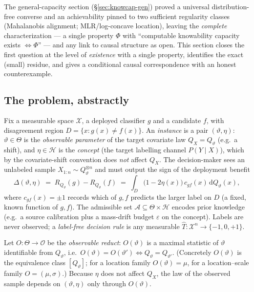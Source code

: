 \providecommand{\TV}{\mathrm{TV}}
\providecommand{\sgn}{\operatorname{sign}}

The general-capacity section (\S\ref{sec:knowcap-gen}) proved a universal
distribution-free converse and an achievability pinned to two sufficient
regularity classes (Mahalanobis alignment; MLR/log-concave location), leaving the
\emph{complete} characterization --- a single property $\Phi$ with
``computable knowability capacity exists $\iff\Phi$'' --- and any link to causal
structure as open. This section closes the first question at the level of
\emph{existence} with a single property, identifies the exact (small) residue, and
gives a conditional causal correspondence with an honest counterexample.

\subsection{The problem, abstractly}\label{sec:dich-abstract}
Fix a measurable space $\mathcal X$, a deployed classifier $g$ and a candidate $f$,
with disagreement region $D=\{x:g(x)\neq f(x)\}$. An \emph{instance} is a pair
$(\vartheta,\eta)$: $\vartheta\in\Theta$ is the \emph{observable parameter} of the
target covariate law $Q_X=Q_\vartheta$ (e.g.\ a shift), and $\eta\in\mathcal H$ is
the \emph{concept} (the target labelling channel $P(Y\mid X)$), which by the
covariate-shift convention does \emph{not} affect $Q_X$. The decision-maker sees an
unlabeled sample $X_{1:n}\sim Q_\vartheta^{\otimes n}$ and must output the sign of
the deployment benefit
\begin{equation}\label{eq:dich-benefit}
  \Delta(\vartheta,\eta)\;=\;R_{Q_\vartheta}(g)-R_{Q_\vartheta}(f)
  \;=\;\int_D \big(1-2\eta(x)\big)\,c_{gf}(x)\,\mathrm dQ_\vartheta(x),
\end{equation}
where $c_{gf}(x)=\pm1$ records which of $g,f$ predicts the larger label on $D$
(a fixed, known function of $g,f$). The admissible set $\mathcal A\subseteq\Theta\times\mathcal H$
encodes prior knowledge (e.g.\ a source calibration plus a mass-drift budget
$\varepsilon$ on the concept). Labels are never observed; a \emph{label-free decision
rule} is any measurable $\hat T:\mathcal X^n\to\{-1,0,+1\}$.

\begin{definition}\label{def:dich-obs}
Let $O:\Theta\to\mathcal O$ be the \emph{observable reduct}: $O(\vartheta)$ is a
maximal statistic of $\vartheta$ identifiable from $Q_\vartheta$, i.e.\
$O(\vartheta)=O(\vartheta')\iff Q_\vartheta=Q_{\vartheta'}$. (Concretely $O(\vartheta)$
is the equivalence class $[Q_\vartheta]$; for a location family $O(\vartheta)=\mu$,
for a location--scale family $O=(\mu,\sigma)$.) Because $\eta$ does not affect $Q_X$,
the law of the observed sample depends on $(\vartheta,\eta)$ only through $O(\vartheta)$.
\end{definition}

